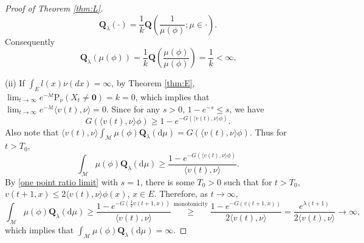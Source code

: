 \documentclass[12pt,a4paper]{amsart}
\numberwithin{equation}{section}
\theoremstyle{plain}
\theoremstyle{definition}
\theoremstyle{remark}
\begin{document}
\begin{proof}[Proof of Theorem \ref{thm:L}]
\begin{equation}\label{rep: yaglom}
\mathbf Q_\lambda(\cdot)=\dfrac{1}{k}{\mathbf Q}\left(\dfrac{1}{\mu(\phi)}; \mu\in\cdot\right).
\end{equation}
Consequently
\begin{equation}\label{ident: k}
\mathbf Q_\lambda(\mu(\phi))=\dfrac{1}{k}{\mathbf Q}\left(\dfrac{\mu(\phi)}{\mu(\phi) }\right)=\dfrac{1}{k}<\infty.
\end{equation}


(ii) If $\int_El(x)\nu(dx)=\infty$,
by Theorem \ref{thm:E},
$\lim_{t\to\infty}e^{-\lambda t}\mathrm P_\nu(X_t\neq \mathbf 0)=k=0$,
which implies that
 $\lim_{t\to\infty}e^{-\lambda t}\langle v(t),\nu\rangle=0$.  Since for any $s>0$,  $1-e^{-s}\leq s$, we have
$$G(\langle v(t),\nu\rangle\phi)\geq 1-e^{-G(\langle v(t),\nu\rangle\phi)}.$$
Also note that $\langle v(t),\nu\rangle
\int_{\mathcal M}\mu(\phi)\mathbf Q_\lambda(\mathrm d\mu)=G(\langle v(t),\nu\rangle\phi).$
Thus  for $t>T_0$,
\[
\int_{\mathcal M}\mu(\phi)\mathbf Q_\lambda(\mathrm d\mu)
\geq \dfrac{1-e^{-G(\langle v(t),\nu\rangle\phi)}}{\langle v(t),\nu\rangle}.
\]
 By \eqref{one point ratio limit} with $s=1$,
 there is some $T_0>0$ such that for $t>T_0$, $v(t+1,x)\leq 2\langle v(t),\nu\rangle\phi(x)$, $x\in E$.
 Therefore, as $t\to\infty$,
 \[
\int_{\mathcal M}\mu(\phi)\mathbf Q_\lambda(\mathrm d\mu)
\geq \dfrac{1-e^{-G(\frac{1}{2}v(t+1,x))}}{\langle v(t),\nu\rangle}\overset{\text{monotonicity}}\geq
\dfrac{1-e^{-G(v(t+1,x))}}{2\langle v(t),\nu\rangle}
=\dfrac{e^{\lambda(t+1)}}{2\langle v(t),\nu\rangle}\to\infty,
\]
which implies that
$\int_{\mathcal M}\mu(\phi)\mathbf Q_\lambda(\mathrm d\mu)=\infty$.


\end{proof}
\end{document}
